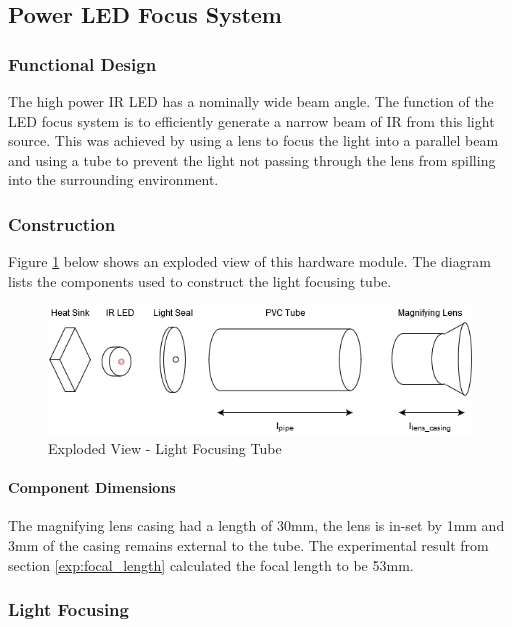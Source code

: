 



\subsection{Power LED Focus System}

\subsubsection{Functional Design}
The high power IR LED has a nominally wide beam angle. The function of the LED focus system is to efficiently generate a narrow beam of IR from this light source. This was achieved by using a lens to focus the light into a parallel beam and using a tube to prevent the light not passing through the lens from spilling into the surrounding environment.


\subsubsection{Construction}
Figure \ref{fig:light_focusing_tube} below shows an exploded view of this hardware module. The diagram lists the components used to construct the light focusing tube.

\begin{figure}[H]
	\centering
	\includegraphics[width=.8\textwidth]{figures/design/beam_tube.png}
	\caption{Exploded View - Light Focusing Tube}
	\label{fig:light_focusing_tube}
\end{figure}

\paragraph{Component Dimensions}
The magnifying lens casing had a length of 30mm, the lens is in-set by 1mm and 3mm of the casing remains external to the tube. The experimental result from section \ref{exp:focal_length} calculated the focal length to be 53mm.

\subsubsection{Light Focusing}

